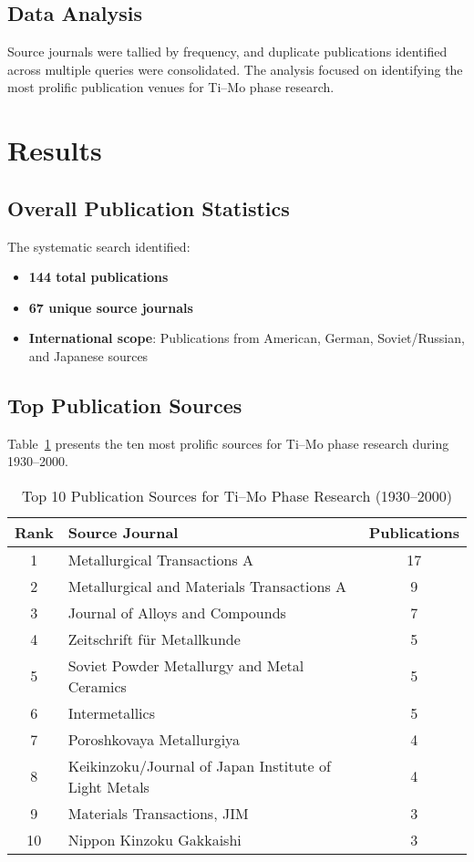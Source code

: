 \documentclass[11pt,a4paper]{article}
\begin{document}
\subsection{Data Analysis}

Source journals were tallied by frequency, and duplicate publications identified across multiple queries were consolidated. The analysis focused on identifying the most prolific publication venues for Ti--Mo phase research.

\section{Results}

\subsection{Overall Publication Statistics}

The systematic search identified:
\begin{itemize}
    \item \textbf{144 total publications}
    \item \textbf{67 unique source journals}
    \item \textbf{International scope}: Publications from American, German, Soviet/Russian, and Japanese sources
\end{itemize}

\subsection{Top Publication Sources}

Table~\ref{tab:top_sources} presents the ten most prolific sources for Ti--Mo phase research during 1930--2000.

\begin{table}[h]
\centering
\caption{Top 10 Publication Sources for Ti--Mo Phase Research (1930--2000)}
\label{tab:top_sources}
\begin{tabular}{@{}clc@{}}
\toprule
Rank & Source Journal & Publications \\
\midrule
1 & Metallurgical Transactions A & 17 \\
2 & Metallurgical and Materials Transactions A & 9 \\
3 & Journal of Alloys and Compounds & 7 \\
4 & Zeitschrift f{\"u}r Metallkunde & 5 \\
5 & Soviet Powder Metallurgy and Metal Ceramics & 5 \\
6 & Intermetallics & 5 \\
7 & Poroshkovaya Metallurgiya & 4 \\
8 & Keikinzoku/Journal of Japan Institute of Light Metals & 4 \\
9 & Materials Transactions, JIM & 3 \\
10 & Nippon Kinzoku Gakkaishi & 3 \\
\bottomrule
\end{tabular}
\end{table}
\end{document}
